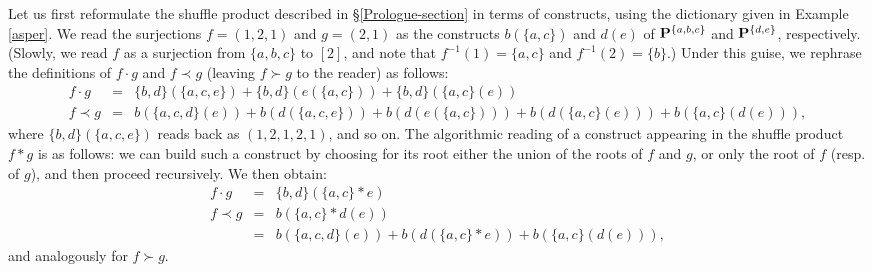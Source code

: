 \documentclass[11pt]{article}
\theoremstyle{definition}
\numberwithin{equation}{section}
\numberwithin{equation}{section}
\newcommand{\set}[1]{\{#1\}}
\newcommand{\hyper}[1]{{\bf #1}}
\newcommand{\bcdot}{\,{\bm \cdot}\,}
\begin{document}
 Let us first reformulate the shuffle product described in  \S\ref{Prologue-section} in terms of constructs, using the dictionary given in Example \ref{asper}. We read the surjections
$f=(1,2,1)$ and $g=(2,1)$ as the constructs $b(\set{a,c})$ and $d(e)$ of $\hyper{P}^{\set{a,b,c}}$ and $\hyper{P}^{\set{d,e}}$, respectively. (Slowly, we read $f$ as a surjection from $\set{a,b,c}$ to $[2]$, and note that $f^{-1}(1)=\set{a,c}$ and $f^{-1}(2)=\set{b}$.) Under this guise, we  rephrase the definitions of $f\bcdot g$ and $f\prec g$ (leaving  $f\succ g$ to the reader)  as follows:
{\small{$$\begin{array}{rcl}
f\bcdot g &= &   \set{b,d}(\set{a,\!c,\!e })\! + \!\set{b,\!d}(e(\set{a,\!c}))\! + \!\set{b,\!d}(\set{a,\!c}(e))\\[0.15cm]
f\prec g & =&   b(\set{a,\!c,\!d}(e))\! +\! b(d(\set{a,\!c,\!e}))\!+ \! b(d(e(\set{a,\!c})))\! +\! b(d(\set{a,\!c}(e))) \!+ \! b(\set{a,\!c}(d(e))),
\end{array}$$}}
where $\set{b,d}(\set{a,c,e })$ reads back as  $(1,2,1,2,1)$, and so on. The algorithmic reading of a construct appearing in the shuffle product $f\ast g$ is as follows: we can build such a construct by choosing for its root either the union of the roots of  $f$ and $g$,  or only the root of $f$ (resp. of $g$),  and  then proceed recursively. We then obtain: 
$$\begin{array}{rcl}
f\bcdot g &= &   \{b,d\}(\{a,c\}\ast e)\\[0.15cm]
f\prec g & =&   b(\{a,c\}\ast d(e)) \\
&= &b(\{a,c,d\}(e))+b(d(\{a,c\}\ast e))+b(\{a,c\}(d(e))),
\end{array}$$ 
and analogously for $f\succ g$.
\end{document}
